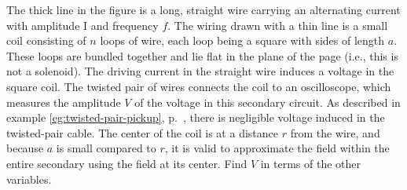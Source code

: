 The thick line in the figure is a long, straight wire carrying an alternating current with amplitude I and frequency $f$.
The wiring drawn with a thin line is a small coil consisting of $n$ loops of wire, each loop being a square with sides of length $a$.
These loops are
bundled together and lie flat in the plane of the page (i.e., this is not a solenoid). 
The driving current in the straight wire induces a voltage in the square coil.
The twisted pair of wires connects the coil to an oscilloscope, which measures the amplitude $V$ of the voltage in
this secondary circuit. As described in example \ref{eg:twisted-pair-pickup},
p.~\pageref{eg:twisted-pair-pickup}, there is negligible voltage induced in the twisted-pair cable.
The center of the coil is at a distance $r$ from the wire, and because $a$ is small compared
to $r$, it is valid to approximate the field within the entire secondary using the field at its center.
Find $V$ in terms of the other variables.
